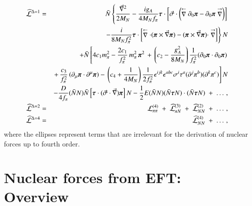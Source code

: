 \documentclass[sort&compress,preprint,3p]{elsarticle}
\begin{document}
\begin{eqnarray}
\widehat{\cal L}^{\Delta=1} &=&
 \bar{N} \left\{
 \frac{{\vec \nabla}^2}{2M_N} 
-\frac{ig_A}{4M_Nf_\pi} 
\mbox{\boldmath $\tau$} \cdot 
\left[
\vec \sigma \cdot
\left( \stackrel{\leftarrow}{\nabla} 
\partial_0 \mbox{\boldmath $\pi$}
 -
\partial_0 \mbox{\boldmath $\pi$}
\stackrel{\rightarrow}{\nabla} \right)
\right]
\right.
\nonumber \\ &&
\left.
- \frac{i}{8M_N f_\pi^2}
\mbox{\boldmath $\tau$} \cdot 
\left[
\stackrel{\leftarrow}{\nabla} 
\cdot
( \mbox{\boldmath $\pi$} \times \vec\nabla \mbox{\boldmath $\pi$} )
   -   
( \mbox{\boldmath $\pi$} \times \vec\nabla \mbox{\boldmath $\pi$} )
\cdot
\stackrel{\rightarrow}{\nabla} 
\right]
\right\} N 
\nonumber \\ &&
+ \bar{N} \left[
 4c_1m_\pi^2
-\frac{2 c_1}{f_\pi^2} \, m_\pi^2\, \mbox{\boldmath $\pi$}^2 
\, + \, 
\left( c_2 - \frac{g_A^2}{8M_N}\right) 
\frac{1}{f_\pi^2}
(\partial_0 \mbox{\boldmath{$\pi$}} \cdot 
 \partial_0 \mbox{\boldmath{$\pi$}})
\right.  \nonumber \\ &&  \left.
 + \, \frac{c_3}{f_\pi^2}\,
(\partial_\mu \mbox{\boldmath{$\pi$}} \cdot 
\partial^\mu \mbox{\boldmath{$\pi$}})
 - \, \left( c_4 + \frac{1}{4M_N} \right) 
\frac{1}{2f_\pi^2}
\epsilon^{ijk} \epsilon^{abc} \sigma^i \tau^a
(\partial^j \pi^b) (\partial^k \pi^c)
 \right] N 
\nonumber \\ &&
- \frac{D}{4f_\pi} (\bar{N}N) \bar{N} \left[ 
\mbox{\boldmath $\tau$} 
\cdot ( \vec \sigma \cdot \vec \nabla )
\mbox{\boldmath $\pi$} 
\right] N
-\frac12 E
(\bar{N}N)
(\bar{N}
\mbox{\boldmath $\tau$} 
N)
\cdot
(\bar{N}
\mbox{\boldmath $\tau$} 
N)
\; + \; \ldots \,,
\label{eq_LD1}
\\
\widehat{\cal L}^{\Delta=2} &=&
\; {\cal L}^{(4)}_{\pi\pi} \; +
\; \widehat{\cal L}^{(3)}_{\pi N} \; + \; \widehat{\cal L}^{(2)}_{NN}
\; + \; \ldots \,,
\label{eq_LD2}
\\
\widehat{\cal L}^{\Delta=4} &=&
\; \widehat{\cal L}^{(4)}_{NN}
\; + \; \ldots \,,
\label{eq_LD4}
\end{eqnarray}
where the ellipses represent terms that are irrelevant
for the derivation of nuclear forces up to fourth
order.



\section{Nuclear forces from EFT: Overview
\label{sec_overview}}
\end{document}
